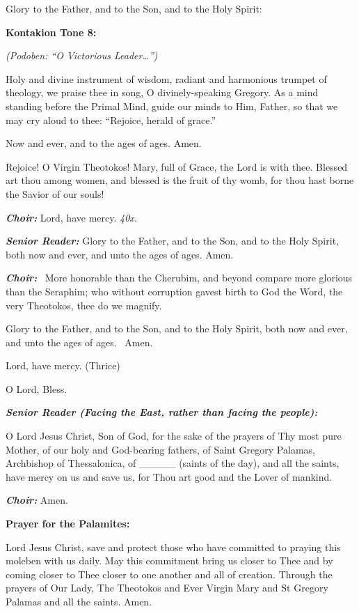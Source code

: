 Glory to the Father, and to the Son, and to the Holy Spirit:

\textbf{Kontakion Tone 8:}

\emph{(Podoben: ``O Victorious Leader\ldots{}'')}

Holy and divine instrument of wisdom, radiant and harmonious trumpet of theology, we praise thee in song, O divinely-speaking Gregory. 
As a mind standing before the Primal Mind, guide our minds to Him, Father, so that
we may cry aloud to thee: 
``Rejoice, herald of grace.''

Now and ever, and to the ages of ages. Amen.

Rejoice! O Virgin Theotokos! 
Mary, full of Grace, the Lord is with thee.
Blessed art thou among women, and blessed is the fruit of thy womb, for thou hast borne the Savior of our souls!

\textbf{\emph{Choir:}}
 Lord, have mercy.
 \emph{40x.}

\textbf{\emph{Senior Reader:}}
 Glory to the Father, and to the Son, and to the Holy Spirit, both now and ever, and unto the ages of ages. 
Amen.

\textbf{\emph{Choir:}}
~More honorable than the Cherubim, and beyond compare more glorious than the Seraphim; 
who without corruption gavest birth to God the Word, the very Theotokos, thee do we magnify.

Glory to the Father, and to the Son, and to the Holy Spirit, both now and ever, and unto the ages of ages.
~Amen.

Lord, have mercy.
 (Thrice)

O Lord, Bless.

\textbf{\emph{Senior Reader (Facing the East, rather than facing the
people):}}

O Lord Jesus Christ, Son of God, for the sake of the prayers of Thy most pure Mother, of our holy and God-bearing fathers, of Saint Gregory Palamas, Archbishop of Thessalonica, of \_\_\_\_\_ (saints of the day), and all the saints, have mercy on us and save us, for Thou art good and the Lover of mankind.

\textbf{\emph{Choir:}}
 Amen.

\textbf{Prayer for the Palamites:}

Lord Jesus Christ, save and protect those who have committed to praying this moleben with us daily. 
May this commitment bring us closer to Thee and by coming closer to Thee closer to one another and all of creation.
Through the prayers of Our Lady, The Theotokos and Ever Virgin Mary and St Gregory Palamas and all the saints. Amen.

